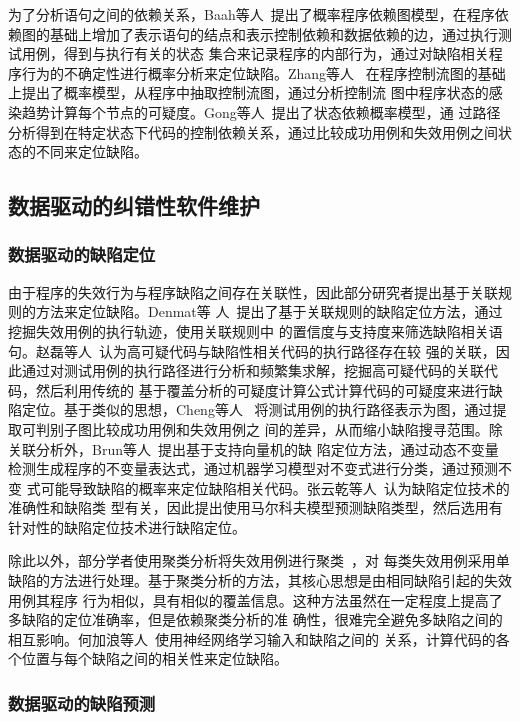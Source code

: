 为了分析语句之间的依赖关系，Baah等人~\cite{baah2010probabilistic}提出了概率程序依赖图模型，在程序依
赖图的基础上增加了表示语句的结点和表示控制依赖和数据依赖的边，通过执行测试用例，得到与执行有关的状态
集合来记录程序的内部行为，通过对缺陷相关程序行为的不确定性进行概率分析来定位缺陷。Zhang等人
~\cite{zhang2009capturing}在程序控制流图的基础上提出了概率模型，从程序中抽取控制流图，通过分析控制流
图中程序状态的感染趋势计算每个节点的可疑度。Gong等人~\cite{gong2015state}提出了状态依赖概率模型，通
过路径分析得到在特定状态下代码的控制依赖关系，通过比较成功用例和失效用例之间状态的不同来定位缺陷。

\subsection{数据驱动的纠错性软件维护}

\subsubsection{数据驱动的缺陷定位}
由于程序的失效行为与程序缺陷之间存在关联性，因此部分研究者提出基于关联规则的方法来定位缺陷。Denmat等
人~\cite{denmat2005data}提出了基于关联规则的缺陷定位方法，通过挖掘失效用例的执行轨迹，使用关联规则中
的置信度与支持度来筛选缺陷相关语句。赵磊等人~\cite{zl}认为高可疑代码与缺陷性相关代码的执行路径存在较
强的关联，因此通过对测试用例的执行路径进行分析和频繁集求解，挖掘高可疑代码的关联代码，然后利用传统的
基于覆盖分析的可疑度计算公式计算代码的可疑度来进行缺陷定位。基于类似的思想，Cheng等人
~\cite{cheng2009identifying}将测试用例的执行路径表示为图，通过提取可判别子图比较成功用例和失效用例之
间的差异，从而缩小缺陷搜寻范围。除关联分析外，Brun等人~\cite{brun2004finding}提出基于支持向量机的缺
陷定位方法，通过动态不变量检测生成程序的不变量表达式，通过机器学习模型对不变式进行分类，通过预测不变
式可能导致缺陷的概率来定位缺陷相关代码。张云乾等人~\cite{malcov2013}认为缺陷定位技术的准确性和缺陷类
型有关，因此提出使用马尔科夫模型预测缺陷类型，然后选用有针对性的缺陷定位技术进行缺陷定位。

除此以外，部分学者使用聚类分析将失效用例进行聚类~\cite{jones2007debugging, zheng2006statistical}，对
每类失效用例采用单缺陷的方法进行处理。基于聚类分析的方法，其核心思想是由相同缺陷引起的失效用例其程序
行为相似，具有相似的覆盖信息。这种方法虽然在一定程度上提高了多缺陷的定位准确率，但是依赖聚类分析的准
确性，很难完全避免多缺陷之间的相互影响。何加浪等人~\cite{neural2013}使用神经网络学习输入和缺陷之间的
关系，计算代码的各个位置与每个缺陷之间的相关性来定位缺陷。

\subsubsection{数据驱动的缺陷预测}

